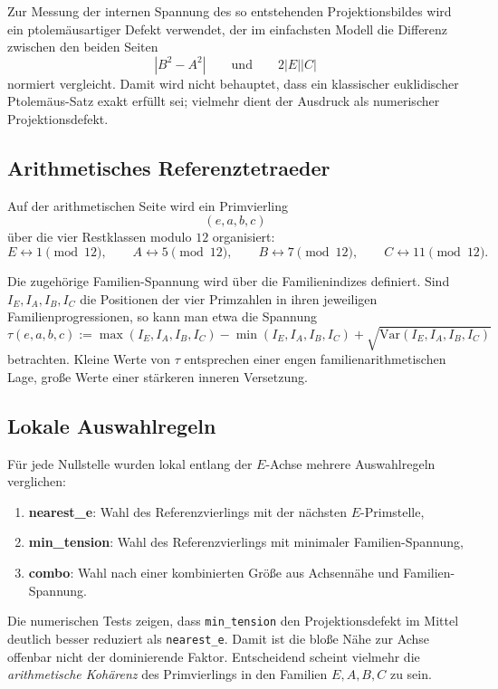 \documentclass[11pt,a4paper]{article}
\theoremstyle{definition}
\begin{document}
Zur Messung der internen Spannung des so entstehenden Projektionsbildes wird ein ptolemäusartiger Defekt verwendet, der im einfachsten Modell die Differenz zwischen den beiden Seiten
\[
|B^2-A^2|
\qquad\text{und}\qquad
2|E||C|
\]
normiert vergleicht. Damit wird nicht behauptet, dass ein klassischer euklidischer Ptolemäus-Satz exakt erfüllt sei; vielmehr dient der Ausdruck als numerischer Projektionsdefekt.

\subsection{Arithmetisches Referenztetraeder}

Auf der arithmetischen Seite wird ein Primvierling
\[
(e,a,b,c)
\]
über die vier Restklassen modulo \(12\) organisiert:
\[
E\leftrightarrow 1 \pmod{12},\qquad
A\leftrightarrow 5 \pmod{12},\qquad
B\leftrightarrow 7 \pmod{12},\qquad
C\leftrightarrow 11 \pmod{12}.
\]

Die zugehörige Familien-Spannung wird über die Familienindizes definiert. Sind \(I_E,I_A,I_B,I_C\) die Positionen der vier Primzahlen in ihren jeweiligen Familienprogressionen, so kann man etwa die Spannung
\[
\tau(e,a,b,c)
:=
\max(I_E,I_A,I_B,I_C)-\min(I_E,I_A,I_B,I_C)
+\sqrt{\mathrm{Var}(I_E,I_A,I_B,I_C)}
\]
betrachten. Kleine Werte von \(\tau\) entsprechen einer engen familienarithmetischen Lage, große Werte einer stärkeren inneren Versetzung.

\subsection{Lokale Auswahlregeln}

Für jede Nullstelle wurden lokal entlang der \(E\)-Achse mehrere Auswahlregeln verglichen:

\begin{enumerate}
	\item \textbf{nearest\_e}: Wahl des Referenzvierlings mit der nächsten \(E\)-Primstelle,
	\item \textbf{min\_tension}: Wahl des Referenzvierlings mit minimaler Familien-Spannung,
	\item \textbf{combo}: Wahl nach einer kombinierten Größe aus Achsennähe und Familien-Spannung.
\end{enumerate}

Die numerischen Tests zeigen, dass \texttt{min\_tension} den Projektionsdefekt im Mittel deutlich besser reduziert als \texttt{nearest\_e}. Damit ist die bloße Nähe zur Achse offenbar nicht der dominierende Faktor. Entscheidend scheint vielmehr die \emph{arithmetische Kohärenz} des Primvierlings in den Familien \(E,A,B,C\) zu sein.
\end{document}
